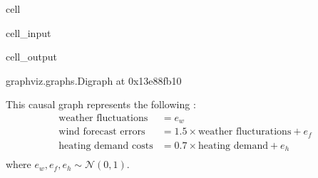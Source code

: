\documentclass[letterpaper,10pt,english]{jupyterBook}
\begin{document}
\begin{sphinxuseclass}{cell}\begin{sphinxVerbatimInput}

\begin{sphinxuseclass}{cell_input}
\begin{sphinxVerbatim}[commandchars=\\\{\}]
  \PYG{p}{[}\PYG{p}{[}  \PYG{p}{]}
              \PYG{p}{[}  \PYG{p}{]}
              \PYG{p}{[}  \PYG{p}{]}\PYG{p}{]}

 \PYG{p}{[}  \PYG{p}{]}
\end{sphinxVerbatim}

\end{sphinxuseclass}\end{sphinxVerbatimInput}
\begin{sphinxVerbatimOutput}

\begin{sphinxuseclass}{cell_output}
\begin{sphinxVerbatim}[commandchars=\\\{\}]
\PYGZlt{}graphviz.graphs.Digraph at 0x13e88fb10\PYGZgt{}
\end{sphinxVerbatim}

\end{sphinxuseclass}\end{sphinxVerbatimOutput}

\end{sphinxuseclass}
\sphinxAtStartPar
This causal graph represents the following :
\label{equation:notebooks/basic_dag_structures:f1320b09-4076-4855-8799-45289c5ce843}\begin{align}
\text{weather fluctuations} &= e_w \\
\text{wind forecast errors} &= 1.5 \times \text{weather flucturations} + e_f \\
\text{heating demand costs} &= 0.7 \times \text{heating demand} + e_h \\
\end{align}
\sphinxAtStartPar
where \(e_w, e_f, e_h \sim \mathcal{N}(0,1)\).
\end{document}
